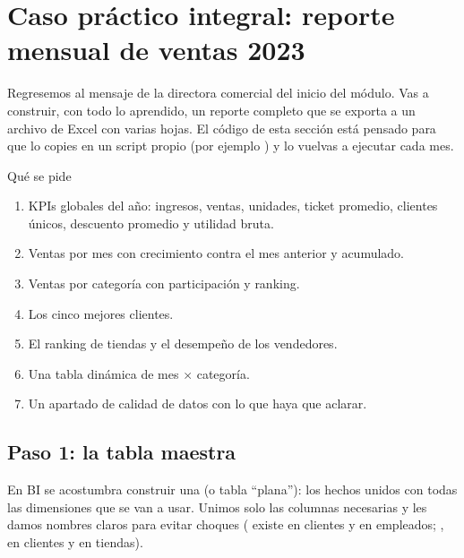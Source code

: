 \section{Caso práctico integral: reporte mensual de ventas 2023}
\label{sec:m2-caso}

Regresemos al mensaje de la directora comercial del inicio del módulo. Vas a
construir, con todo lo aprendido, un reporte completo que se exporta a un
archivo de Excel con varias hojas. El código de esta sección está pensado
para que lo copies en un script propio (por ejemplo
) y lo vuelvas a ejecutar cada mes.

\begin{negocio}{Qué se pide}
\begin{enumerate}
  \item KPIs globales del año: ingresos, ventas, unidades, ticket promedio,
        clientes únicos, descuento promedio y utilidad bruta.
  \item Ventas por mes con crecimiento contra el mes anterior y acumulado.
  \item Ventas por categoría con participación y ranking.
  \item Los cinco mejores clientes.
  \item El ranking de tiendas y el desempeño de los vendedores.
  \item Una tabla dinámica de mes $\times$ categoría.
  \item Un apartado de calidad de datos con lo que haya que aclarar.
\end{enumerate}
\end{negocio}

\subsection{Paso 1: la tabla maestra}

En BI se acostumbra construir una  (o tabla
``plana''): los hechos unidos con todas las dimensiones que se van a usar.
Unimos solo las columnas necesarias y les damos nombres claros para evitar
choques ( existe en clientes y en empleados; ,
en clientes y en tiendas).

